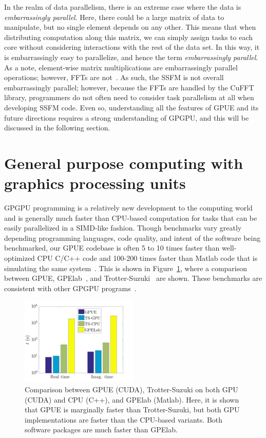 In the realm of data parallelism, there is an extreme case where the data is \textit{embarrassingly parallel}.
Here, there could be a large matrix of data to manipulate, but no single element depends on any other.
This means that when distributing computation along this matrix, we can simply assign tasks to each core without considering interactions with the rest of the data set.
In this way, it is embarrassingly easy to parallelize, and hence the term \textit{embarrassingly parallel}.
As a note, element-wise matrix multiplications are embarrassingly parallel operations; however, FFTs are not~\cite{czechowski2012}.
As such, the SSFM is not overall embarrassingly parallel; however, because the FFTs are handled by the CuFFT library, programmers do not often need to consider task parallelism at all when developing SSFM code.
Even so, understanding all the features of GPUE and its future directions requires a strong understanding of GPGPU, and this will be discussed in the following section.

\section{General purpose computing with graphics processing units}

GPGPU programming is a relatively new development to the computing world and is generally much faster than CPU-based computation for tasks that can be easily parallelized in a SIMD-like fashion.
Though benchmarks vary greatly depending programming languages, code quality, and intent of the software being benchmarked, our GPUE codebase is often 5 to 10 times faster than well-optimized CPU C/C++ code and 100-200 times faster than Matlab code that is simulating the same system~\cite{wittek2016}.
This is shown in Figure~\ref{fig:bench}, where a comparison between GPUE, GPElab~\cite{antoine2014}, and Trotter-Suzuki~\cite{wittek2013} are shown.
These benchmarks are consistent with other GPGPU programs~\cite{garland2008, lee2010, nickolls2010}.

\begin{figure}
\center \includegraphics[width=0.5\textwidth]{data/gpu/GPUEvsTS.png}
\caption{Comparison between GPUE (CUDA), Trotter-Suzuki on both GPU (CUDA) and CPU (C++), and GPElab (Matlab).
Here, it is shown that GPUE is marginally faster than Trotter-Suzuki, but both GPU implementations are faster than the CPU-based variants.
Both software packages are much faster than GPElab.}
\label{fig:bench}
\end{figure}

